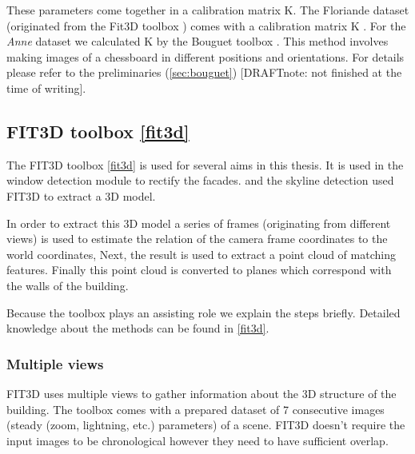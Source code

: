 	These parameters come together in a calibration matrix K.  The Floriande
	dataset (originated from the Fit3D toolbox \cite{Fit3d}) comes with a
	calibration matrix K .  For
	the \emph{Anne} dataset we calculated K by the Bouguet toolbox
	\cite{bouguet}.
	This method involves making images of a chessboard in
	different positions and orientations. For details please refer to the
	preliminaries (\ref{sec:bouguet}) [DRAFTnote: not finished at the
	time of writing].












\subsection{FIT3D toolbox \ref{fit3d}}
\label{sec:prelimFIT3D}
The FIT3D toolbox \ref{fit3d} is used for several aims in this thesis.
It is used in the window detection module to rectify the facades.
and the skyline detection used FIT3D to extract a 3D model.

In order to extract this 3D model a series of frames (originating from different
views) is used to estimate the relation of the camera frame coordinates to the
world coordinates, Next, the result is used to extract a point cloud of matching
features. Finally this point cloud is converted to planes which correspond with the walls of the building.

Because the toolbox plays an assisting role we explain the steps briefly.
Detailed knowledge about the methods can be found in \ref{fit3d}.

\subsubsection{Multiple views}
FIT3D uses multiple views to gather information about the 3D structure of the
building. The toolbox comes with a prepared dataset of 7 consecutive images (steady (zoom, lightning,
etc.) parameters) of a scene.  FIT3D doesn't require the input images to be
chronological however they need to have sufficient overlap. 


